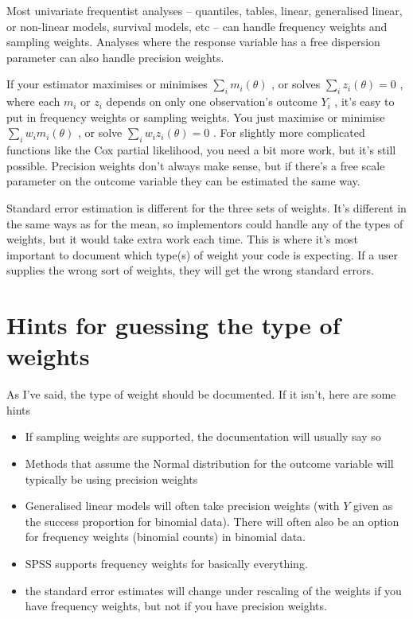 \documentclass[fleqn,10pt]{latex/stylish_article} %
\providecommand{\tightlist}{%
  \setlength{\itemsep}{0pt}\setlength{\parskip}{0pt}}
\begin{document}
Most univariate frequentist analyses -- quantiles, tables, linear, generalised linear, or non-linear models, survival models, etc -- can handle frequency weights and sampling weights. Analyses where the response variable has a free dispersion parameter can also handle precision weights.

If your estimator maximises or minimises
\(\sum_i m_i(\theta)\)
, or solves
\(\sum_i z_i(\theta)=0\)
, where each
\(m_i\)
or
\(z_i\)
depends on only one observation's outcome
\(Y_i\)
, it's easy to put in frequency weights or sampling weights. You just maximise or minimise
\(\sum_i w_im_i(\theta)\)
, or solve
\(\sum_i w_iz_i(\theta)=0\)
. For slightly more complicated functions like the Cox partial likelihood, you need a bit more work, but it's still possible. Precision weights don't always make sense, but if there's a free scale parameter on the outcome variable they can be estimated the same way.

Standard error estimation is different for the three sets of weights. It's different in the same ways as for the mean, so implementors could handle any of the types of weights, but it would take extra work each time. This is where it's most important to document which type(s) of weight your code is expecting. If a user supplies the wrong sort of weights, they will get the wrong standard errors.

\hypertarget{hints-for-guessing-the-type-of-weights}{%
\section{Hints for guessing the type of weights}\label{hints-for-guessing-the-type-of-weights}}

As I've said, the type of weight should be documented. If it isn't, here are some hints

\begin{itemize}
\tightlist
\item
  If sampling weights are supported, the documentation will usually say so
\item
  Methods that assume the Normal distribution for the outcome variable will typically be using precision weights
\item
  Generalised linear models will often take precision weights (with
  \(Y\)
  given as the success proportion for binomial data). There will often also be an option for frequency weights (binomial counts) in binomial data.
\item
  SPSS supports frequency weights for basically everything.
\item
  the standard error estimates will change under rescaling of the weights if you have frequency weights, but not if you have precision weights.
\end{itemize}
\end{document}
